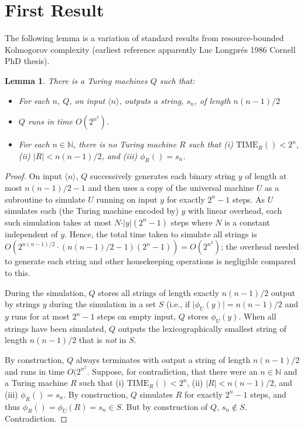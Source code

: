 \documentclass{article}
\newtheorem{lemma}{Lemma}
\newcommand{\bincode}[1]{\ensuremath{\langle #1 \rangle}}
\newcommand{\tmtime}[2]{\ensuremath{\mathrm{TIME}_{#1}(#2)}}
\begin{document}
\section{First Result}
The following lemma is a variation of standard results from resource-bounded Kolmogorov complexity (earliest
reference apparently Luc Longpr{\'e}s 1986 Cornell PhD thesis).

\begin{lemma}\label{lem:slowpokes}
There is a Turing machines $Q$  such that:

\begin{itemize}

\item For each $n$, $Q$, on input $\bincode{n}$, outputs a string, $s_n$, of length $n(n-1)/2$

\item $Q$ runs in time $O(2^{n^2})$.

\item For each $n \in \mathbb{N}$, there is no Turing machine $R$ such that
(i) $\tmtime{R}{} < 2^n$, (ii) $\vert R \vert < n(n-1)/2$, and (iii) $\phi_R() = s_n$.

\end{itemize}
\end{lemma}

\begin{proof}
On input $\bincode{n}$, $Q$ successively generates each binary string $y$ of length at most
$n(n-1)/2 - 1$ and then uses a copy of the universal machine $U$ as a subroutine to simulate
$U$ running on input $y$ for exactly $2^{n} - 1$ steps. As $U$ simulates each (the Turing machine encoded by)
$y$ with linear overhead, each such simulation takes at most $N \cdot \vert y \vert (2^{n} - 1)$ steps
where $N$ is a constant independent of $y$. Hence, the total time taken to
simulate all strings is $O(2^{n(n-1)/2} \cdot (n(n-1)/2 - 1)(2^{n} - 1)) = O(2^{n^2})$; the overhead needed
to generate each string and other housekeeping operations is negligible compared to this.

During the simulation, $Q$ stores all strings of length exactly $n(n-1)/2$ output by strings $y$ during the simulation
in a set $S$
(i.e., if $\vert \phi_U(y)\vert = n(n-1)/2$ and $y$ runs for at most $2^{n} - 1$ steps on empty input, $Q$ stores $\phi_U(y)$. When all strings have been simulated, $Q$ outputs the lexicographically smallest string
of length $n(n-1)/2$ that is \emph{not} in $S$.

By construction, $Q$ always terminates with output a string of length $n(n-1)/2$ and runs in time $O(2^{n^2}$.
Suppose, for contradiction, that there were an $n \in \mathbb{N}$ and a Turing machine $R$
such that (i) $\tmtime{R}{} < 2^n$, (ii) $\vert R \vert < n(n-1)/2$, and (iii) $\phi_R() = s_n$. By construction, $Q$ simulates $R$
for exactly $2^{n} - 1$ steps, and thus $\phi_R() = \phi_U(R) = s_n \in S$. But by construction of $Q$, $s_n \notin S$. Contradiction.
\end{proof}
\end{document}

